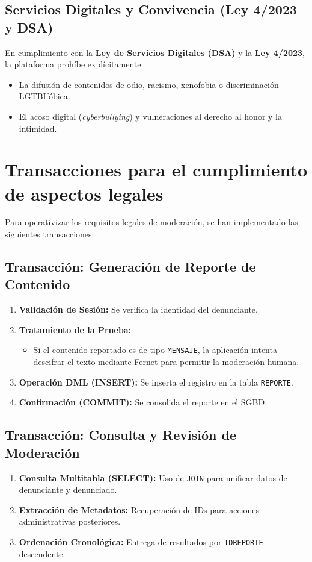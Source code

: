 \subsection{Servicios Digitales y Convivencia (Ley 4/2023 y DSA)}
En cumplimiento con la \textbf{Ley de Servicios Digitales (DSA)} y la \textbf{Ley 4/2023}, la plataforma prohíbe explícitamente:
\begin{itemize}
    \item La difusión de contenidos de odio, racismo, xenofobia o discriminación LGTBIfóbica.
    \item El acoso digital (\textit{cyberbullying}) y vulneraciones al derecho al honor y la intimidad.
\end{itemize}

\section{Transacciones para el cumplimiento de aspectos legales}
Para operativizar los requisitos legales de moderación, se han implementado las siguientes transacciones:

\subsection{Transacción: Generación de Reporte de Contenido}
\begin{enumerate}
    \item \textbf{Validación de Sesión:} Se verifica la identidad del denunciante.
    \item \textbf{Tratamiento de la Prueba:} 
    \begin{itemize}
        \item Si el contenido reportado es de tipo \texttt{MENSAJE}, la aplicación intenta descifrar el texto mediante Fernet para permitir la moderación humana.
    \end{itemize}
    \item \textbf{Operación DML (INSERT):} Se inserta el registro en la tabla \texttt{REPORTE}.
    \item \textbf{Confirmación (COMMIT):} Se consolida el reporte en el SGBD.
\end{enumerate}



\subsection{Transacción: Consulta y Revisión de Moderación}
\begin{enumerate}
    \item \textbf{Consulta Multitabla (SELECT):} Uso de \texttt{JOIN} para unificar datos de denunciante y denunciado.
    \item \textbf{Extracción de Metadatos:} Recuperación de IDs para acciones administrativas posteriores.
    \item \textbf{Ordenación Cronológica:} Entrega de resultados por \texttt{IDREPORTE} descendente.
\end{enumerate}

